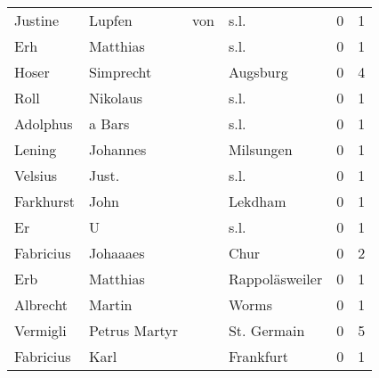 \begin{center}
\begin{tiny}
\begin{longtabu}{llllrr}
                  Justine &                             Lupfen &         von &                                        s.l. &          0 &         1 \\
                      Erh &                           Matthias &             &                                        s.l. &          0 &         1 \\
                    Hoser &                          Simprecht &             &                                    Augsburg &          0 &         4 \\
                     Roll &                           Nikolaus &             &                                        s.l. &          0 &         1 \\
                 Adolphus &                             a Bars &             &                                        s.l. &          0 &         1 \\
                   Lening &                           Johannes &             &                                   Milsungen &          0 &         1 \\
                  Velsius &                              Just. &             &                                        s.l. &          0 &         1 \\
                Farkhurst &                               John &             &                                     Lekdham &          0 &         1 \\
                       Er &                                  U &             &                                        s.l. &          0 &         1 \\
                Fabricius &                           Johaaaes &             &                                        Chur &          0 &         2 \\
                      Erb &                           Matthias &             &                              Rappoläsweiler &          0 &         1 \\
                 Albrecht &                             Martin &             &                                       Worms &          0 &         1 \\
                 Vermigli &                      Petrus Martyr &             &                                 St. Germain &          0 &         5 \\
                Fabricius &                               Karl &             &                                   Frankfurt &          0 &         1 \\

\end{longtabu}
\end{tiny}
\end{center}
